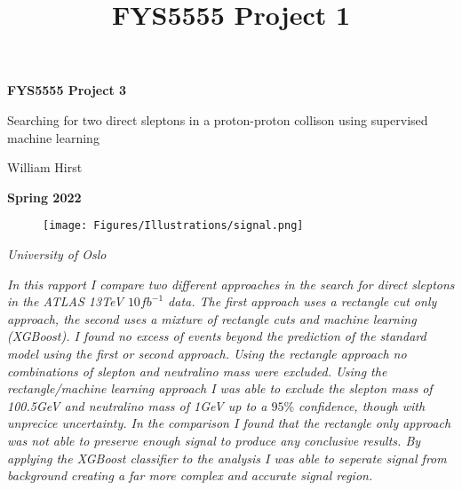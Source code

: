 \documentclass{article}
\begin{document}
\title{FYS5555 Project 1}
\date{}
\begin{titlepage}
\centering
{\LARGE\bfseries FYS5555 Project 3}

\vspace{1cm}

{\Large Searching for two direct sleptons in a proton-proton collison using supervised machine learning}

\vspace{1.5cm}

{\large William Hirst}

\vspace{1cm}

{\bfseries Spring 2022}

\vspace{2cm}

\begin{figure}[H]
    \centering
    \texttt{[image: Figures/Illustrations/signal.png]}
    \label{fig:signal}
\end{figure}

\vfill

{\itshape University of Oslo}
\end{titlepage}
\newpage
\pagestyle{fancy}
\fancyfoot{}
\fancyfoot[R]{\thepage}

\begin{center}
\centering
\textit{
In this rapport I compare two different approaches in the search for direct sleptons in the ATLAS 13TeV $10fb^{-1}$ data. The first approach uses a rectangle cut only approach, the second uses a mixture of rectangle cuts and machine learning (XGBoost). I found no excess of events beyond the prediction of the standard model using the first or second approach. Using the rectangle approach no combinations of slepton and neutralino mass were excluded. Using the rectangle/machine learning approach I was able to exclude the slepton mass of 100.5GeV and neutralino mass of 1GeV up to a $95\%$ confidence, though with unprecice uncertainty. In the comparison I found that the rectangle only approach was not able to preserve enough signal to produce any conclusive results. By applying the XGBoost classifier to the analysis I was able to seperate signal from background creating a far more complex and accurate signal region. 
}
\end{center}
\end{document}

